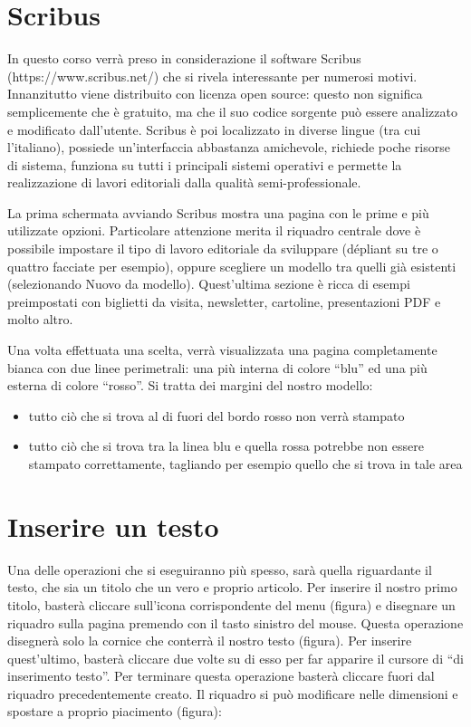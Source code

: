 \documentclass[a4paper, 12pt]{book}
\begin{document}
\section{Scribus}
In questo corso verrà preso in considerazione il software Scribus (https://www.scribus.net/) che si rivela interessante per numerosi motivi. Innanzitutto viene distribuito con licenza open source: questo non significa semplicemente che è gratuito, ma che il suo codice sorgente può essere analizzato e modificato dall'utente. Scribus è poi localizzato in diverse lingue (tra cui l'italiano), possiede un'interfaccia abbastanza amichevole, richiede poche risorse di sistema, funziona su tutti i principali sistemi operativi e permette la realizzazione di lavori editoriali dalla qualità semi-professionale.

La prima schermata avviando Scribus mostra una pagina con le prime e più utilizzate opzioni. Particolare attenzione merita il riquadro centrale dove è possibile impostare il tipo di lavoro editoriale da sviluppare (dépliant su tre o quattro facciate per esempio), oppure scegliere un modello  tra quelli già esistenti (selezionando Nuovo da modello). Quest'ultima sezione è ricca di esempi preimpostati con biglietti da visita, newsletter, cartoline, presentazioni PDF e molto altro.

Una volta effettuata una scelta, verrà visualizzata una pagina completamente bianca con due linee perimetrali: una più interna di colore “blu” ed una più esterna di colore “rosso”. Si tratta dei margini del nostro modello:

\begin{itemize}
	\item tutto ciò che si trova al di fuori del bordo rosso non verrà stampato
	
	\item tutto ciò che si trova tra la linea blu e quella rossa potrebbe non essere stampato correttamente, tagliando per esempio quello che si trova in tale area
\end{itemize}

\section{Inserire un testo}
Una delle operazioni che si eseguiranno più spesso, sarà quella riguardante il testo, che sia un titolo che un vero e proprio articolo. Per inserire il nostro primo titolo, basterà cliccare sull'icona corrispondente del menu  (figura) e disegnare un riquadro sulla pagina premendo con il tasto sinistro del mouse. Questa operazione disegnerà solo la cornice che conterrà il nostro testo (figura). Per inserire quest'ultimo, basterà cliccare due volte su di esso per far apparire il cursore di “di inserimento testo”. Per terminare questa operazione basterà cliccare fuori dal riquadro precedentemente creato. 
Il riquadro si può modificare nelle dimensioni e spostare a proprio piacimento (figura):
\end{document}
